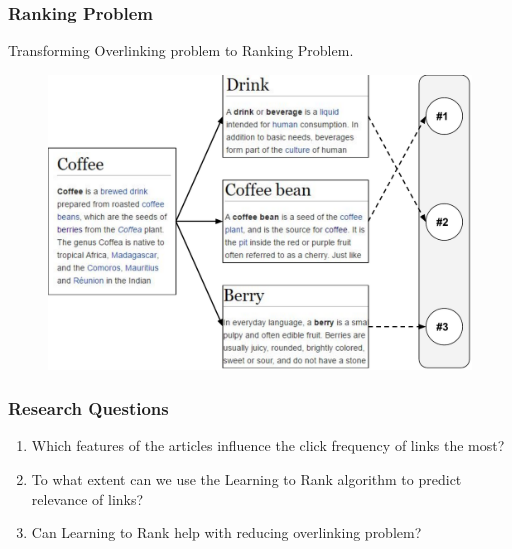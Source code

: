 \begin{frame}
  \frametitle{Ranking Problem}
  Transforming Overlinking problem to Ranking Problem.
  \begin{figure}[tbph]
    \centering
    \includegraphics[width=0.7\linewidth]{images/concept}
  \end{figure}
  
\end{frame}

\begin{frame}
  \frametitle{Research Questions}
  \begin{enumerate}
	\item Which features of the articles influence the click frequency of links the most?
	\item To what extent can we use the Learning to Rank algorithm to predict relevance of links?
	\item Can Learning to Rank help with reducing overlinking problem?
  \end{enumerate}
\end{frame}

